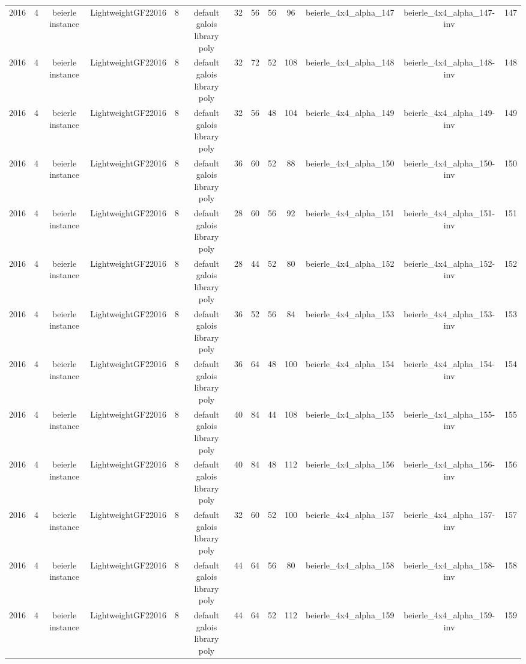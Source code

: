 \begin{tabular}{c c c c c c c c c c c c c}
2016 & 4 & beierle instance & LightweightGF22016 & 8 & default galois library poly & 32 & 56 & 56 & 96 & beierle_4x4_alpha_147 & beierle_4x4_alpha_147-inv & 147 \\
2016 & 4 & beierle instance & LightweightGF22016 & 8 & default galois library poly & 32 & 72 & 52 & 108 & beierle_4x4_alpha_148 & beierle_4x4_alpha_148-inv & 148 \\
2016 & 4 & beierle instance & LightweightGF22016 & 8 & default galois library poly & 32 & 56 & 48 & 104 & beierle_4x4_alpha_149 & beierle_4x4_alpha_149-inv & 149 \\
2016 & 4 & beierle instance & LightweightGF22016 & 8 & default galois library poly & 36 & 60 & 52 & 88 & beierle_4x4_alpha_150 & beierle_4x4_alpha_150-inv & 150 \\
2016 & 4 & beierle instance & LightweightGF22016 & 8 & default galois library poly & 28 & 60 & 56 & 92 & beierle_4x4_alpha_151 & beierle_4x4_alpha_151-inv & 151 \\
2016 & 4 & beierle instance & LightweightGF22016 & 8 & default galois library poly & 28 & 44 & 52 & 80 & beierle_4x4_alpha_152 & beierle_4x4_alpha_152-inv & 152 \\
2016 & 4 & beierle instance & LightweightGF22016 & 8 & default galois library poly & 36 & 52 & 56 & 84 & beierle_4x4_alpha_153 & beierle_4x4_alpha_153-inv & 153 \\
2016 & 4 & beierle instance & LightweightGF22016 & 8 & default galois library poly & 36 & 64 & 48 & 100 & beierle_4x4_alpha_154 & beierle_4x4_alpha_154-inv & 154 \\
2016 & 4 & beierle instance & LightweightGF22016 & 8 & default galois library poly & 40 & 84 & 44 & 108 & beierle_4x4_alpha_155 & beierle_4x4_alpha_155-inv & 155 \\
2016 & 4 & beierle instance & LightweightGF22016 & 8 & default galois library poly & 40 & 84 & 48 & 112 & beierle_4x4_alpha_156 & beierle_4x4_alpha_156-inv & 156 \\
2016 & 4 & beierle instance & LightweightGF22016 & 8 & default galois library poly & 32 & 60 & 52 & 100 & beierle_4x4_alpha_157 & beierle_4x4_alpha_157-inv & 157 \\
2016 & 4 & beierle instance & LightweightGF22016 & 8 & default galois library poly & 44 & 64 & 56 & 80 & beierle_4x4_alpha_158 & beierle_4x4_alpha_158-inv & 158 \\
2016 & 4 & beierle instance & LightweightGF22016 & 8 & default galois library poly & 44 & 64 & 52 & 112 & beierle_4x4_alpha_159 & beierle_4x4_alpha_159-inv & 159 \\

\end{tabular}
